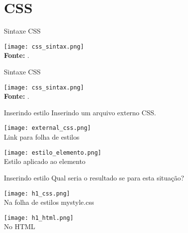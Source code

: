 \documentclass{beamer}
\begin{document}
\section{CSS}
\begin{frame}{Sintaxe CSS}
  \begin{center}
    \texttt{[image: css\_sintax.png]} \\
    \tiny \textbf{Fonte:} \cite{freeman2008use}.
  \end{center}
\end{frame}
\begin{frame}{Sintaxe CSS}
  \begin{center}
    \texttt{[image: css\_sintax.png]} \\
    \tiny \textbf{Fonte:} \cite{freeman2008use}.
  \end{center}
\end{frame}
\begin{frame}{Inserindo estilo}
Inserindo um arquivo externo CSS.
  \begin{center}
    \texttt{[image: external\_css.png]} \\
    \tiny Link para folha de estilos
  \end{center}
  \begin{center}
    \texttt{[image: estilo\_elemento.png]} \\
    \tiny Estilo aplicado ao elemento
  \end{center} 
\end{frame}
\begin{frame}{Inserindo estilo}
Qual seria o resultado se para esta situação?
  \begin{center}
    \texttt{[image: h1\_css.png]} \\
		  \tiny Na folha de estilos mystyle.css
	  \end{center}
	  \begin{center}
		  \texttt{[image: h1\_html.png]} \\
		  \tiny No HTML
	  \end{center}
	  
\end{frame}
\end{document}
